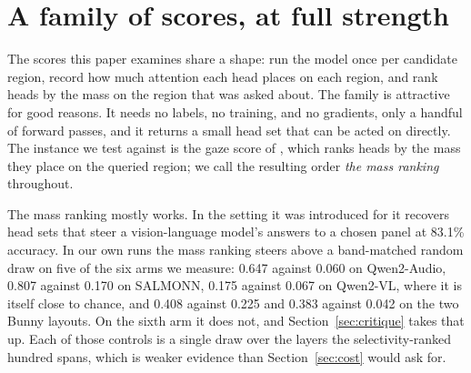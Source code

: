 \documentclass[11pt]{article}
\begin{document}
\section{A family of scores, at full strength}
\label{sec:family}

The scores this paper examines share a shape: run the model once per candidate
region, record how much attention each head places on each region, and rank heads
by the mass on the region that was asked about. The family is attractive for good
reasons. It needs no labels, no training, and no gradients, only a handful of
forward passes, and it returns a small head set that can be acted on directly.
The instance we test against is the gaze score of \citet{gandikota2026gaze},
which ranks heads by the mass they place on the queried region; we call the
resulting order \emph{the mass ranking} throughout.

The mass ranking mostly works. In the setting it was introduced for it recovers
head sets that steer a vision-language model's answers to a chosen panel at
83.1\% accuracy. In our own runs the mass ranking steers above a band-matched
random draw on five of the six arms we measure: 0.647 against 0.060 on
Qwen2-Audio, 0.807 against 0.170 on SALMONN, 0.175 against 0.067 on Qwen2-VL,
where it is itself close to chance, and 0.408 against 0.225 and 0.383 against
0.042 on the two Bunny layouts. On the sixth arm it does not, and
Section~\ref{sec:critique} takes that up. Each of those controls is a single draw
over the layers the selectivity-ranked hundred spans, which is weaker evidence
than Section~\ref{sec:cost} would ask for.
\end{document}

